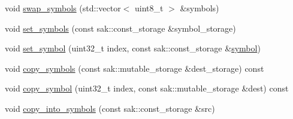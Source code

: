 \begin{DoxyCompactItemize}
\begin{DoxyCompactList}\small\item\em \end{DoxyCompactList}\item 
void \hyperlink{classkodo_1_1deep__symbol__storage_a6424bd1cd8b98f6813848e2478c6b987}{swap\-\_\-symbols} (std\-::vector$<$ uint8\-\_\-t $>$ \&symbols)
\begin{DoxyCompactList}\small\item\em \end{DoxyCompactList}\item 
void \hyperlink{classkodo_1_1deep__symbol__storage_aadfa7caf517a1573fc282b32bdf299a4}{set\-\_\-symbols} (const sak\-::const\-\_\-storage \&symbol\-\_\-storage)
\begin{DoxyCompactList}\small\item\em \end{DoxyCompactList}\item 
void \hyperlink{classkodo_1_1deep__symbol__storage_a8652e89a7ecd7daed47b7f0d5fc3f237}{set\-\_\-symbol} (uint32\-\_\-t index, const sak\-::const\-\_\-storage \&\hyperlink{classkodo_1_1deep__symbol__storage_a9dcd4cad9f836987d0bd53b4bac99984}{symbol})
\begin{DoxyCompactList}\small\item\em \end{DoxyCompactList}\item 
void \hyperlink{classkodo_1_1deep__symbol__storage_a1892c29b7002d8a2fc9b6b4d48d8205e}{copy\-\_\-symbols} (const sak\-::mutable\-\_\-storage \&dest\-\_\-storage) const 
\begin{DoxyCompactList}\small\item\em \end{DoxyCompactList}\item 
void \hyperlink{classkodo_1_1deep__symbol__storage_a4179c6d0816eeec26f71f36fe065fd70}{copy\-\_\-symbol} (uint32\-\_\-t index, const sak\-::mutable\-\_\-storage \&dest) const 
\begin{DoxyCompactList}\small\item\em \end{DoxyCompactList}\item 
void \hyperlink{classkodo_1_1deep__symbol__storage_a94e158331829b6f73383d10bb7eea113}{copy\-\_\-into\-\_\-symbols} (const sak\-::const\-\_\-storage \&src)
\begin{DoxyCompactList}\small\item\em \end{DoxyCompactList}\item 

\end{DoxyCompactItemize}
